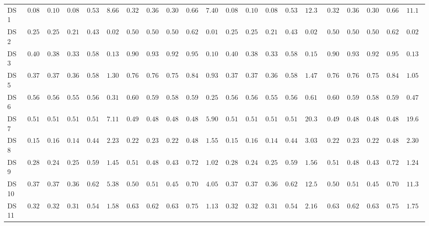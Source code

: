 {\begin{longtable}{|l|ccccc|ccccc|ccccc|ccccc|}
		DS 1 & $0.0833$ & $0.1024$ & $0.0858$ & $0.5325$ & $8.6688$ & $0.3264$ & $0.3657$ & $0.3035$ & $0.6697$ & $\boldsymbol{7.4065}$ & $0.0833$ & $0.1024$ & $0.0858$ & $0.5325$ & $12.3225$ & $0.3264$ & $0.3657$ & $0.3035$ & $0.6697$ & $11.1560$ \\
		DS 2 & $0.2500$ & $0.2500$ & $0.2167$ & $0.4375$ & $0.0231$ & $0.5000$ & $0.5000$ & $0.5000$ & $0.6250$ & $\boldsymbol{0.0171}$ & $0.2500$ & $0.2500$ & $0.2167$ & $0.4375$ & $0.0226$ & $0.5000$ & $0.5000$ & $0.5000$ & $0.6250$ & $0.0203$ \\
		DS 3 & $0.4000$ & $0.3812$ & $0.3333$ & $0.5875$ & $0.1337$ & $0.9000$ & $0.9375$ & $0.9226$ & $0.9583$ & $\boldsymbol{0.1041}$ & $0.4000$ & $0.3812$ & $0.3333$ & $0.5875$ & $0.1593$ & $0.9000$ & $0.9375$ & $0.9226$ & $0.9583$ & $0.1397$ \\
		DS 5 & $0.3768$ & $0.3772$ & $0.3614$ & $0.5848$ & $1.3037$ & $0.7681$ & $0.7657$ & $0.7571$ & $0.8438$ & $\boldsymbol{0.9328}$ & $0.3768$ & $0.3772$ & $0.3614$ & $0.5848$ & $1.4760$ & $0.7681$ & $0.7657$ & $0.7571$ & $0.8438$ & $1.0551$ \\
		DS 6 & $0.5600$ & $0.5641$ & $0.5572$ & $0.5641$ & $0.3184$ & $0.6000$ & $0.5929$ & $0.5833$ & $0.5929$ & $\boldsymbol{0.2557}$ & $0.5600$ & $0.5641$ & $0.5572$ & $0.5641$ & $0.6134$ & $0.6000$ & $0.5929$ & $0.5833$ & $0.5929$ & $0.4767$ \\
		DS 7 & $0.5192$ & $0.5170$ & $0.5164$ & $0.5170$ & $7.1135$ & $0.4904$ & $0.4885$ & $0.4881$ & $0.4885$ & $\boldsymbol{5.9066}$ & $0.5192$ & $0.5170$ & $0.5164$ & $0.5170$ & $20.3345$ & $0.4904$ & $0.4885$ & $0.4881$ & $0.4885$ & $19.6308$ \\
		DS 8 & $0.1525$ & $0.1622$ & $0.1494$ & $0.4415$ & $2.2325$ & $0.2203$ & $0.2337$ & $0.2205$ & $0.4891$ & $\boldsymbol{1.5553}$ & $0.1525$ & $0.1622$ & $0.1494$ & $0.4415$ & $3.0349$ & $0.2203$ & $0.2337$ & $0.2205$ & $0.4891$ & $2.3088$ \\
		DS 9 & $0.2889$ & $0.2455$ & $0.2546$ & $0.5958$ & $1.4578$ & $0.5111$ & $0.4891$ & $0.4379$ & $0.7263$ & $\boldsymbol{1.0210}$ & $0.2889$ & $0.2455$ & $0.2546$ & $0.5958$ & $1.5620$ & $0.5111$ & $0.4891$ & $0.4379$ & $0.7263$ & $1.2448$ \\
		DS 10 & $0.3778$ & $0.3713$ & $0.3692$ & $0.6228$ & $5.3881$ & $0.5000$ & $0.5131$ & $0.4527$ & $0.7078$ & $\boldsymbol{4.0541}$ & $0.3778$ & $0.3713$ & $0.3692$ & $0.6228$ & $12.5520$ & $0.5000$ & $0.5131$ & $0.4527$ & $0.7078$ & $11.3120$ \\
		DS 11 & $0.3289$ & $0.3222$ & $0.3140$ & $0.5482$ & $1.5847$ & $0.6316$ & $0.6296$ & $0.6304$ & $0.7531$ & $\boldsymbol{1.1327}$ & $0.3289$ & $0.3222$ & $0.3140$ & $0.5482$ & $2.1691$ & $0.6316$ & $0.6296$ & $0.6304$ & $0.7531$ & $1.7501$ \\

\end{longtable}}
